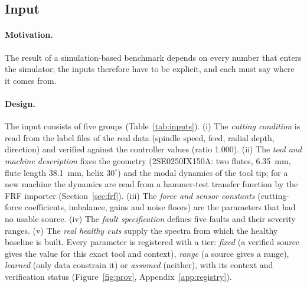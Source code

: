 \documentclass[11pt]{article}
\begin{document}
\subsection{Input}\label{sec:input}
\paragraph{Motivation.} The result of a simulation-based benchmark depends on every number that enters the simulator; the inputs therefore have to be explicit, and each must say where it comes from.
\paragraph{Design.} The input consists of five groups (Table~\ref{tab:inputs}).
(i) The \emph{cutting condition} is read from the label files of the real data (spindle speed, feed, radial depth, direction) and verified against the controller values (ratio 1.000).
(ii) The \emph{tool and machine description} fixes the geometry (2SE0250IX150A: two flutes, 6.35~mm, flute length 38.1~mm, helix $30^\circ$) and the modal dynamics of the tool tip; for a new machine the dynamics are read from a hammer-test transfer function by the FRF importer (Section~\ref{sec:frf}).
(iii) The \emph{force and sensor constants} (cutting-force coefficients, imbalance, gains and noise floors) are the parameters that had no usable source.
(iv) The \emph{fault specification} defines five faults and their severity ranges.
(v) The \emph{real healthy cuts} supply the spectra from which the healthy baseline is built.
Every parameter is registered with a tier: \emph{fixed} (a verified source gives the value for this exact tool and context), \emph{range} (a source gives a range), \emph{learned} (only data constrain it) or \emph{assumed} (neither), with its context and verification status (Figure~\ref{fig:prov}, Appendix~\ref{app:registry}).
\end{document}
